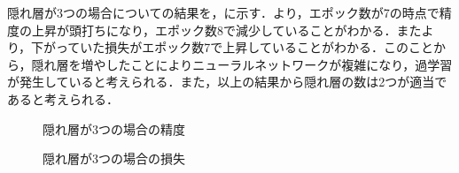 \documentclass{eithesis}
\begin{document}
  隠れ層が3つの場合についての結果を，に示す．より，エポック数が7の時点で精度の上昇が頭打ちになり，エポック数8で減少していることがわかる．またより，下がっていた損失がエポック数7で上昇していることがわかる．このことから，隠れ層を増やしたことによりニューラルネットワークが複雑になり，過学習が発生していると考えられる．また，以上の結果から隠れ層の数は2つが適当であると考えられる．
  \begin{figure}[htbp]
    \centering
    \caption{隠れ層が3つの場合の精度}
    \label{fig_hidden3_acc}
  \end{figure}
  \begin{figure}[htbp]
    \centering
    \caption{隠れ層が3つの場合の損失}
    \label{fig_hidden3_loss}
  \end{figure}
\end{document}
